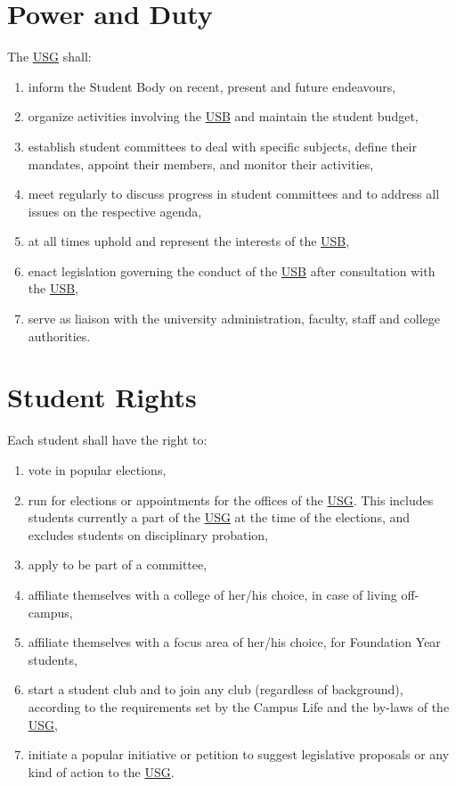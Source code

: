 \documentclass[12pt]{LaTeX_Misc/constitution}
\begin{document}
\section{Power and Duty}
The \hyperref[USGdef]{USG} shall: 
\begin{enumerate}
\item inform the Student Body on recent, present and future endeavours,
\item organize activities involving the \hyperref[studentbody]{USB} and maintain the student budget,
\item establish student committees to deal with specific subjects, define their mandates, appoint their members, and monitor their activities,
\item meet regularly to discuss progress in student committees and to address all issues on the respective agenda,
\item at all times uphold and represent the interests of the \hyperref[studentbody]{USB},
\item enact legislation governing the conduct of the \hyperref[studentbody]{USB} after consultation with the \hyperref[studentbody]{USB},
\item serve as liaison with the university administration, faculty, staff and college authorities.
\end{enumerate}

\section{Student Rights}
Each student shall have the right to:
\begin{enumerate}[nosep] 
\item
vote in popular elections,

\item
run for elections or appointments for the offices of the \hyperref[USGdef]{USG}. This includes students currently a part of the \hyperref[USGdef]{USG} at the time of the elections, and excludes students on disciplinary probation,

\item
apply to be part of a committee,

\item
affiliate themselves with a college of her/his choice, in case of living off-campus,

\item 
affiliate themselves with a focus area of her/his choice, for Foundation Year students,

\item
start a student club and to join any club (regardless of background), according to the requirements set by the Campus Life and the by-laws of the \hyperref[USGdef]{USG},

\item
initiate a popular initiative or petition to suggest legislative proposals or any kind of action to the \hyperref[USGdef]{USG}.
\end{enumerate}
\end{document}
